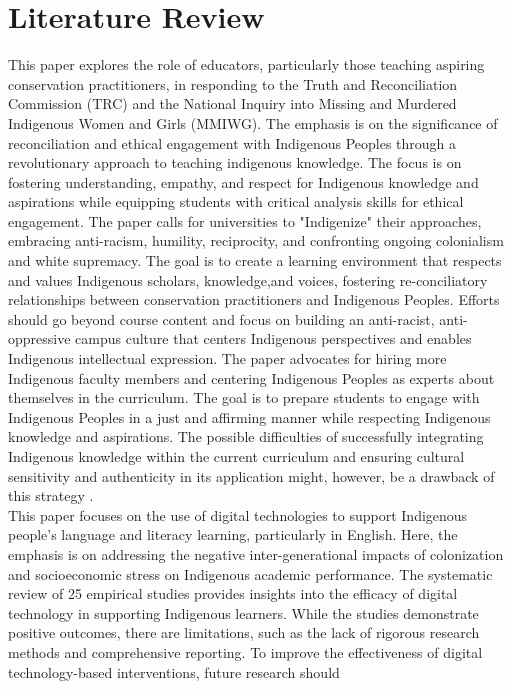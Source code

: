 \documentclass[conference]{IEEEtran}
\begin{document}
\section{\textbf{Literature Review}}
This paper explores the role of educators, particularly those teaching aspiring conservation practitioners, in responding to the Truth and Reconciliation Commission (TRC) and the National Inquiry into Missing and Murdered Indigenous Women and Girls (MMIWG). The emphasis is on the significance of reconciliation and ethical engagement with Indigenous Peoples through a revolutionary approach to teaching indigenous knowledge. The focus is on fostering understanding, empathy, and respect for Indigenous knowledge and aspirations while equipping students with critical analysis skills for ethical engagement. The paper calls for universities to "Indigenize" their approaches, embracing anti-racism, humility, reciprocity, and confronting ongoing colonialism and white supremacy. The goal is to create a learning environment that respects and values Indigenous scholars, knowledge,and voices, fostering re-conciliatory relationships between conservation practitioners and Indigenous Peoples. Efforts should go beyond course content and focus on building an anti-racist, anti-oppressive campus culture that
centers Indigenous perspectives and enables Indigenous intellectual expression. The paper advocates for hiring more Indigenous faculty members and centering Indigenous Peoples as experts about themselves in the curriculum. The goal is to prepare students to engage with Indigenous Peoples in a just and affirming manner while respecting Indigenous knowledge and aspirations. The possible difficulties of successfully integrating Indigenous knowledge within the current curriculum and ensuring cultural sensitivity and authenticity in its application might, 
 however, be a drawback of this strategy \cite{r10}.
\\This paper focuses on the use of digital technologies to support Indigenous people’s language and literacy learning, particularly in English. Here, the emphasis is on addressing the negative inter-generational impacts of colonization and socioeconomic stress on Indigenous academic performance. The systematic review of 25 empirical studies provides insights into the efficacy of digital technology in supporting Indigenous learners. While the studies demonstrate positive outcomes, there are limitations, such as the lack of rigorous research methods and comprehensive reporting. To improve the effectiveness
of digital technology-based interventions, future research should
\end{document}
